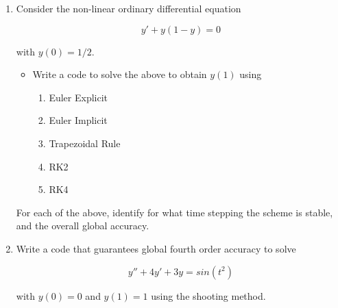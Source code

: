 \documentclass{article}
\begin{document}
\begin{enumerate}
\item Consider the non-linear ordinary differential equation

    \begin{equation*}
        y' + y(1 - y) = 0
    \end{equation*}

        with $y(0) = 1/2$.

        \begin{itemize}
            \item Write a code to solve the above to obtain $y(1)$ using
                \begin{enumerate}
                    \item Euler Explicit
                    \item Euler Implicit
                    \item Trapezoidal Rule
                    \item RK2
                    \item RK4
                \end{enumerate}
        \end{itemize}

        For each of the above, identify for what time stepping the scheme is stable, and
        the overall global accuracy.

\item Write a code that guarantees global fourth order accuracy to solve

    \begin{equation*}
        y'' + 4y' + 3y = sin(t^{2})
    \end{equation*}

        with $y(0) = 0$ and $y(1) = 1$ using the shooting method.

\end{enumerate}
\end{document}
